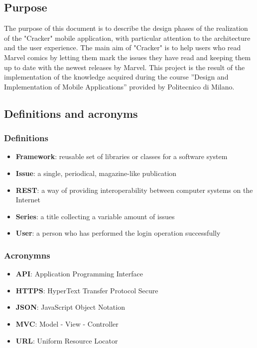 \subsection{Purpose}
The purpose of this document is to describe the design phases of the realization of the "Cracker" mobile application, with particular attention to the architecture and the user experience. \newline
The main aim of "Cracker" is to help users who read Marvel comics by letting them mark the issues they have read and keeping them up to date with the newest releases by Marvel. \newline
This project is the result of the implementation of the knowledge acquired during the course ”Design and Implementation of Mobile Applications” provided by Politecnico di Milano.


\subsection{Definitions and acronyms}
\subsubsection{Definitions}
\begin{itemize}
\item {\textbf{Framework}}: reusable set of libraries or classes for a software system
\item {\textbf{Issue}}: a single, periodical, magazine-like publication
\item {\textbf{REST}}: a way of providing interoperability between computer systems on the Internet
\item {\textbf{Series}}: a title collecting a variable amount of issues
\item {\textbf{User}}: a person who has performed the login operation successfully
\end{itemize}

\subsubsection{Acronymns}
\begin{itemize}
\item {\textbf{API}}: Application Programming Interface
\item {\textbf{HTTPS}}: HyperText Transfer Protocol Secure
\item {\textbf{JSON}}: JavaScript Object Notation
\item {\textbf{MVC}}: Model - View - Controller
\item {\textbf{URL}}: Uniform Resource Locator
\end{itemize}


